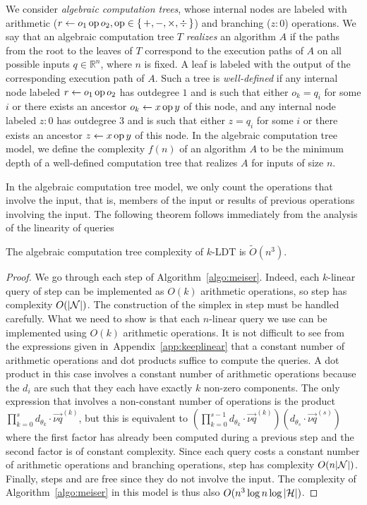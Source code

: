 We consider \emph{algebraic computation trees}, whose internal nodes
are labeled with arithmetic (\(r \gets o_1 \operatorname{op} o_2, \operatorname{op} \in
\{\,+,-,\times,\div\,\}\)) and branching (\(z : 0\)) operations. We say that an
algebraic computation tree $T$ \emph{realizes} an algorithm $A$ if the paths
from the root to the leaves of $T$ correspond to the execution paths of \(A\)
on all possible inputs \(q \in \mathbb{R}^n\), where \(n\) is fixed. A leaf is
labeled with the output of the corresponding execution path of \(A\). Such a
tree is \emph{well-defined} if any internal node labeled \(r \gets o_1 \operatorname{op}
o_2\) has outdegree \(1\) and is such that either \(o_k = q_i\) for some \(i\)
or there exists an ancestor \(o_k \gets x \operatorname{op} y\) of this node, and any
internal node labeled \(z : 0\) has outdegree \(3\) and is such that either \(z
= q_i\) for some \(i\) or there exists an ancestor \(z \gets x \operatorname{op} y\) of this
node. In the algebraic computation tree model, we define the complexity
\(f(n)\) of an algorithm $A$ to be the minimum depth of a well-defined
computation tree that realizes $A$ for inputs of size $n$.

In the algebraic computation tree model, we only count the operations that
involve the input, that is, members of the input or results of previous
operations involving the input. The following theorem follows immediately from
the analysis of the linearity of queries
\begin{theorem}\label{thm:act}
	The algebraic computation tree complexity of \(k\)-LDT is
	\(\tilde{O}(n^3)\).
\end{theorem}

\begin{proof}
We go through each step of Algorithm~\ref{algo:meiser}.
Indeed, each \(k\)-linear query of step  can be implemented as
\(O(k)\) arithmetic operations, so step  has complexity
\(O(|{\mathcal{N}}|)\).
The construction of the simplex in step  must be handled carefully.
What we need to show is that each \(n\)-linear query we use can be implemented
using $O(k)$ arithmetic operations. It is not difficult to see from the
expressions given in~Appendix~\ref{app:keeplinear} that a constant number of arithmetic
operations and dot products suffice to
compute the queries. A dot product in this case involves a constant number
of arithmetic operations because the \(d_i\) are such that they each have
exactly \(k\) non-zero components. The only expression that involves a
non-constant number of operations is the product \(\prod_{k=0}^{s}
d_{\theta_{k}} \cdot \vec{\nu q}^{(k)}\), but this is equivalent to
\((\prod_{k=0}^{s-1}
	d_{\theta_{k}} \cdot \vec{\nu q}^{(k)})(d_{\theta_{s}} \cdot
	\vec{\nu q}^{(s)})\)
where the first factor has already been computed during a previous step and
the second factor is of constant complexity. Since each query costs a constant
number of arithmetic operations and branching operations, step 
has complexity \(O(n|{\mathcal{N}}|)\).
Finally, steps  and  are free since they do not involve the
input. The complexity of Algorithm~\ref{algo:meiser} in this model is thus also \(O(n^3
\log n \log |{\mathcal{H}}|)\).
\end{proof}

